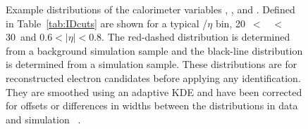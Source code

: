 \begin{figure}[h]
  \caption[Example distributions of the calorimeter variables \rhadone, \fIII, and \fI.]{Example distributions of the calorimeter variables \rhadone, \fIII, and \fI.
    Defined in Table~\ref{tab:IDcuts} are shown for a typical \et/$\eta$ bin, 20~\GeV $<$ \et\ $<$ 30~\GeV and $0.6<|\eta|<0.8$.
    The red-dashed distribution is determined from a background simulation sample and the black-line distribution is determined from a \Zee simulation sample.
    These distributions are for reconstructed electron candidates before applying any identification.
    They are smoothed using an adaptive KDE and have been corrected for offsets or differences in widths between the distributions in data and simulation 
    ~\cite{Aaboud:2019ynx}.
}
\label{fig:egamma:calorimeterWidth_pdfs}
\end{figure}

